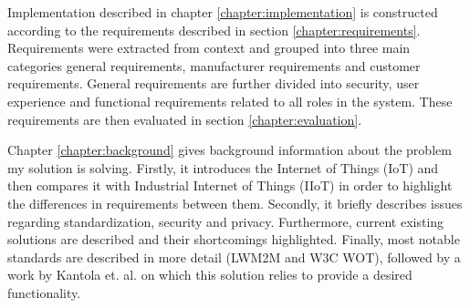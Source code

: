 Implementation described in chapter \ref{chapter:implementation} is constructed according to the requirements described in section \ref{chapter:requirements}. Requirements were extracted from context and grouped into three main categories general requirements, manufacturer requirements and customer requirements. General requirements are further divided into security, user experience and functional requirements related to all roles in the system. These requirements are then evaluated in section \ref{chapter:evaluation}.

Chapter \ref{chapter:background} gives background information about the problem my solution is solving. Firstly, it introduces the Internet of Things (IoT) and then compares it with Industrial Internet of Things (IIoT) in order to highlight the differences in requirements between them. Secondly, it briefly describes issues regarding standardization, security and privacy. Furthermore, current existing solutions are described and their shortcomings highlighted. Finally, most notable standards are described in more detail (LWM2M and W3C WOT), followed by a work by Kantola et. al. \cite{Kantola,5480987} on which this solution relies to provide a desired functionality. 